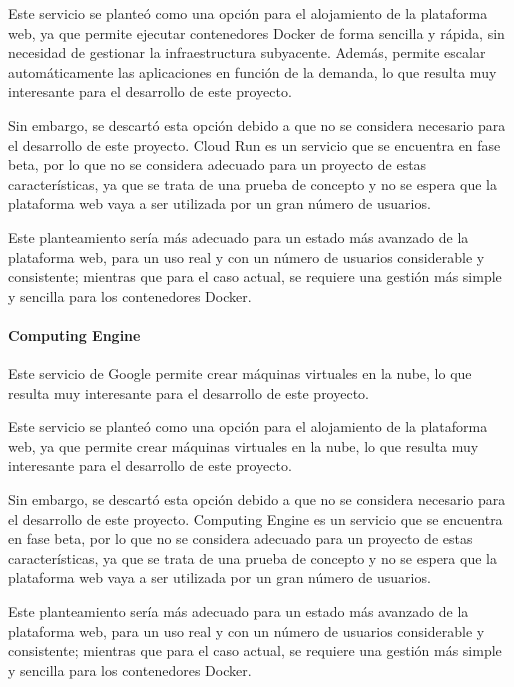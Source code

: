                     Este servicio se planteó como una opción para el alojamiento de la plataforma web, ya que permite ejecutar contenedores Docker de forma sencilla y rápida, sin necesidad de gestionar la infraestructura subyacente. Además, permite escalar automáticamente las aplicaciones en función de la demanda, lo que resulta muy interesante para el desarrollo de este proyecto.

                    Sin embargo, se descartó esta opción debido a que no se considera necesario para el desarrollo de este proyecto. Cloud Run es un servicio que se encuentra en fase beta, por lo que no se considera adecuado para un proyecto de estas características, ya que se trata de una prueba de concepto y no se espera que la plataforma web vaya a ser utilizada por un gran número de usuarios.

                    Este planteamiento sería más adecuado para un estado más avanzado de la plataforma web, para un uso real y con un número de usuarios considerable y consistente; mientras que para el caso actual, se requiere una gestión más simple y sencilla para los contenedores Docker.

                \paragraph{Computing Engine}

                    Este servicio de Google permite crear máquinas virtuales en la nube, lo que resulta muy interesante para el desarrollo de este proyecto.

                    Este servicio se planteó como una opción para el alojamiento de la plataforma web, ya que permite crear máquinas virtuales en la nube, lo que resulta muy interesante para el desarrollo de este proyecto.

                    Sin embargo, se descartó esta opción debido a que no se considera necesario para el desarrollo de este proyecto. Computing Engine es un servicio que se encuentra en fase beta, por lo que no se considera adecuado para un proyecto de estas características, ya que se trata de una prueba de concepto y no se espera que la plataforma web vaya a ser utilizada por un gran número de usuarios.

                    Este planteamiento sería más adecuado para un estado más avanzado de la plataforma web, para un uso real y con un número de usuarios considerable y consistente; mientras que para el caso actual, se requiere una gestión más simple y sencilla para los contenedores Docker.

